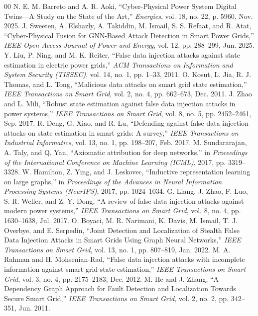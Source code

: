 \documentclass[conference]{IEEEtran}
\begin{document}
\begin{thebibliography}{00}
 N. E. M. Barreto and A. R. Aoki, ``Cyber-Physical Power System Digital Twins---A Study on the State of the Art,'' \emph{Energies}, vol. 18, no. 22, p. 5960, Nov. 2025.
 J. Sweeten, A. Elshazly, A. Takiddin, M. Ismail, S. S. Refaat, and R. Atat, ``Cyber-Physical Fusion for GNN-Based Attack Detection in Smart Power Grids,'' \emph{IEEE Open Access Journal of Power and Energy}, vol. 12, pp. 288--299, Jun. 2025.
 Y. Liu, P. Ning, and M. K. Reiter, ``False data injection attacks against state estimation in electric power grids,'' \emph{ACM Transactions on Information and System Security (TISSEC)}, vol. 14, no. 1, pp. 1--33, 2011.
 O. Kosut, L. Jia, R. J. Thomas, and L. Tong, ``Malicious data attacks on smart grid state estimation,'' \emph{IEEE Transactions on Smart Grid}, vol. 2, no. 4, pp. 662--673, Dec. 2011.
 J. Zhao and L. Mili, ``Robust state estimation against false data injection attacks in power systems,'' \emph{IEEE Transactions on Smart Grid}, vol. 8, no. 5, pp. 2452--2461, Sep. 2017.
 R. Deng, G. Xiao, and R. Lu, ``Defending against false data injection attacks on state estimation in smart grids: A survey,'' \emph{IEEE Transactions on Industrial Informatics}, vol. 13, no. 1, pp. 198--207, Feb. 2017.
 M. Sundararajan, A. Taly, and Q. Yan, ``Axiomatic attribution for deep networks,'' in \emph{Proceedings of the International Conference on Machine Learning (ICML)}, 2017, pp. 3319--3328.
 W. Hamilton, Z. Ying, and J. Leskovec, ``Inductive representation learning on large graphs,'' in \emph{Proceedings of the Advances in Neural Information Processing Systems (NeurIPS)}, 2017, pp. 1024--1034.
 G. Liang, J. Zhao, F. Luo, S. R. Weller, and Z. Y. Dong, ``A review of false data injection attacks against modern power systems,'' \emph{IEEE Transactions on Smart Grid}, vol. 8, no. 4, pp. 1630--1638, Jul. 2017.
 O. Boyaci, M. R. Narimani, K. Davis, M. Ismail, T. J. Overbye, and E. Serpedin, ``Joint Detection and Localization of Stealth False Data Injection Attacks in Smart Grids Using Graph Neural Networks,'' \emph{IEEE Transactions on Smart Grid}, vol. 13, no. 1, pp. 807--819, Jan. 2022.
 M. A. Rahman and H. Mohsenian-Rad, ``False data injection attacks with incomplete information against smart grid state estimation,'' \emph{IEEE Transactions on Smart Grid}, vol. 3, no. 4, pp. 2175--2183, Dec. 2012.
 M. He and J. Zhang, ``A Dependency Graph Approach for Fault Detection and Localization Towards Secure Smart Grid,'' \emph{IEEE Transactions on Smart Grid}, vol. 2, no. 2, pp. 342--351, Jun. 2011.

\end{thebibliography}
\end{document}
